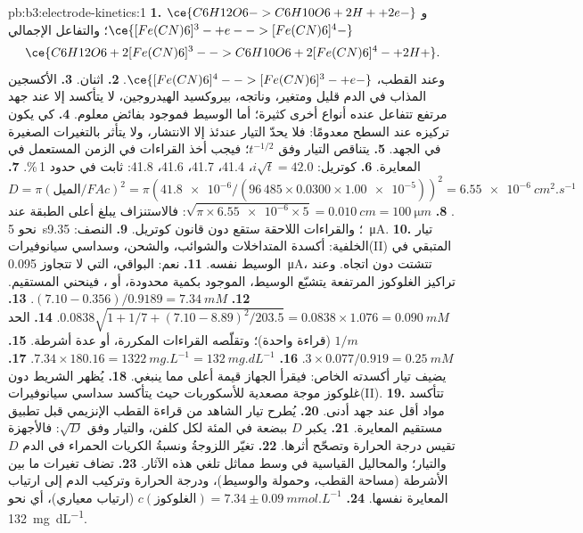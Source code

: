 \begin{solution}{pb:b3:electrode-kinetics:1}
\textbf{1.} $\ce{C6H12O6 -> C6H10O6 + 2 H+ + 2 e-}$ و$\ce{[Fe(CN)6]^3- + e- -> [Fe(CN)6]^4-}$؛
والتفاعل الإجمالي
\[
  \ce{C6H12O6 + 2 [Fe(CN)6]^3- -> C6H10O6 + 2 [Fe(CN)6]^4- + 2 H+} .
\]
وعند القطب، $\ce{[Fe(CN)6]^4- -> [Fe(CN)6]^3- + e-}$.
\textbf{2.} اثنان.
\textbf{3.} الأكسجين المذاب في الدم قليل ومتغير، وناتجه،
بيروكسيد الهيدروجين، لا يتأكسد إلا عند جهد مرتفع تتفاعل عنده أنواع
أخرى كثيرة؛ أما الوسيط فموجود بفائض معلوم.
\textbf{4.} كي يكون تركيزه عند السطح معدومًا: فلا يحدّ التيار عندئذ
إلا الانتشار، ولا يتأثر بالتغيرات الصغيرة في الجهد.
\textbf{5.} يتناقص التيار وفق $t^{-1/2}$؛ فيجب أخذ القراءات في الزمن المستعمل في
المعايرة.
\textbf{6.} كوتريل: $i\sqrt t = 42.0$، 41.4، 41.7، 41.6، 41.8: ثابت في حدود 1\,\%.
\textbf{7.} $D = \pi(\text{الميل}/FAc)^2 = \pi(\num{41.8e-6}/(96\,485 \times 0.0300 \times \num{1.00e-5}))^2 = \qty{6.55e-6}{cm^2.s^{-1}}$.
\textbf{8.} $\sqrt{\pi \times \num{6.55e-6} \times 5} = \qty{0.010}{cm} = \qty{100}{\micro m}$: فالاستنزاف يبلغ أعلى
الطبقة عند نحو \qty{5}{s}؛ والقراءات اللاحقة ستقع دون قانون كوتريل.
\textbf{9.} النصف: \qty{9.35}{\micro A}.
\textbf{10.} تيار الخلفية: أكسدة المتداخلات والشوائب، 
والشحن، وسداسي سيانوفيرات(II) المتبقي في الوسيط نفسه.
\textbf{11.} نعم: البواقي، التي لا تتجاوز \qty{0.095}{\micro A}، تتشتت دون اتجاه. وعند تراكيز الغلوكوز المرتفعة يتشبّع الوسيط، الموجود
بكمية محدودة، أو ، فينحني المستقيم.
\textbf{12.} $(7.10 - 0.356)/0.9189 = \qty{7.34}{mM}$.
\textbf{13.} $0.0838\sqrt{1 + 1/7 + (7.10 - 8.89)^2/203.5} = 0.0838 \times 1.076 = \qty{0.090}{mM}$.
\textbf{14.} الحد $1/m$ (قراءة واحدة)؛ وتقلّصه القراءات المكررة، أو عدة أشرطة.
\textbf{15.} $3 \times 0.077/0.919 = \qty{0.25}{mM}$.
\textbf{16.} $7.34 \times 180.16 = \qty{1322}{mg.L^{-1}} = \qty{132}{mg.dL^{-1}}$.
\textbf{17.} يضيف تيار أكسدته الخاص: فيقرأ الجهاز قيمة أعلى مما ينبغي.
\textbf{18.} يُظهر  الشريط دون غلوكوز موجة مصعدية
للأسكوربات حيث يتأكسد سداسي سيانوفيرات(II).
\textbf{19.} تتأكسد مواد أقل عند جهد أدنى.
\textbf{20.} يُطرح تيار الشاهد من قراءة القطب الإنزيمي
قبل تطبيق مستقيم المعايرة.
\textbf{21.} يكبر $D$ ببضعة في المئة لكل كلفن، والتيار وفق $\sqrt D$: فالأجهزة تقيس
درجة الحرارة وتصحّح أثرها.
\textbf{22.} تغيّر اللزوجةُ ونسبةُ الكريات الحمراء في الدم $D$ والتيار؛
والمحاليل القياسية في وسط مماثل تلغي هذه الآثار.
\textbf{23.} تضاف تغيرات ما بين الأشرطة (مساحة القطب، وحمولة  والوسيط)،
ودرجة الحرارة وتركيب الدم إلى ارتياب المعايرة نفسها.
\textbf{24.} \textbf{$c(\text{الغلوكوز}) = 7.34 \pm \qty{0.09}{mmol.L^{-1}}$} (ارتياب معياري)، أي نحو \qty{132}{mg.dL^{-1}}.
\end{solution}
